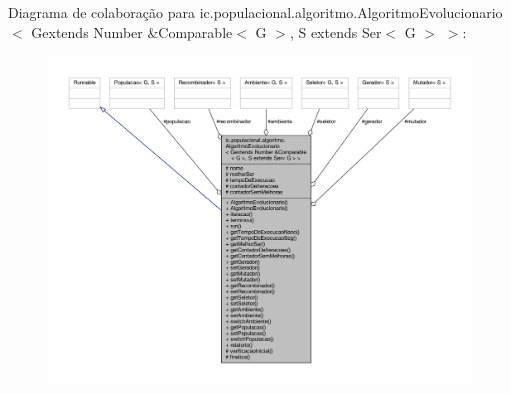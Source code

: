 Diagrama de colaboração para ic.\-populacional.\-algoritmo.\-Algoritmo\-Evolucionario$<$ Gextends Number \&Comparable$<$ G $>$, S extends Ser$<$ G $>$ $>$\-:\nopagebreak
\begin{figure}[H]
\begin{center}
\leavevmode
\includegraphics[width=350pt]{classic_1_1populacional_1_1algoritmo_1_1_algoritmo_evolucionario_3_01_gextends_01_number_01_6_coe0d94f23744d6c3f49b08c61bc2225e5}
\end{center}
\end{figure}
